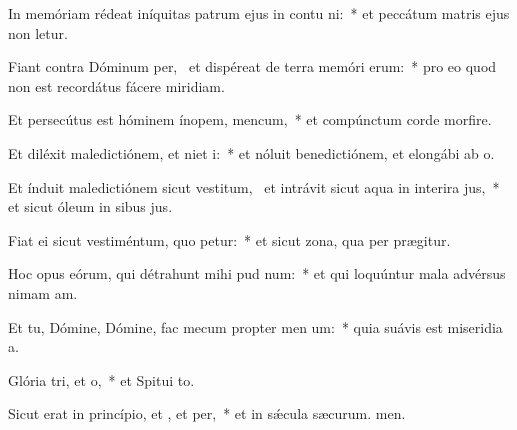 \item In memóriam rédeat iníquitas patrum ejus in contu ni:~* et peccátum matris ejus non letur.
\item Fiant contra Dóminum per,~\pscross{} et dispéreat de terra memóri erum:~* pro eo quod non est recordátus fácere miridiam.
\item Et persecútus est hóminem ínopem,  mencum,~* et compúnctum corde morfire.
\item Et diléxit maledictiónem, et niet i:~* et nóluit benedictiónem, et elongábi ab o.
\item Et índuit maledictiónem sicut vestitum,~\pscross{} et intrávit sicut aqua in interira jus,~* et sicut óleum in sibus jus.
\item Fiat ei sicut vestiméntum, quo petur:~* et sicut zona, qua per prægitur.
\item Hoc opus eórum, qui détrahunt mihi pud num:~* et qui loquúntur mala advérsus nimam am.
\item Et tu, Dómine, Dómine, fac mecum propter men um:~* quia suávis est miseridia a.
\item Glória tri, et o,~* et Spitui to.
\item Sicut erat in princípio, et , et per,~* et in sǽcula sæcurum. men.

